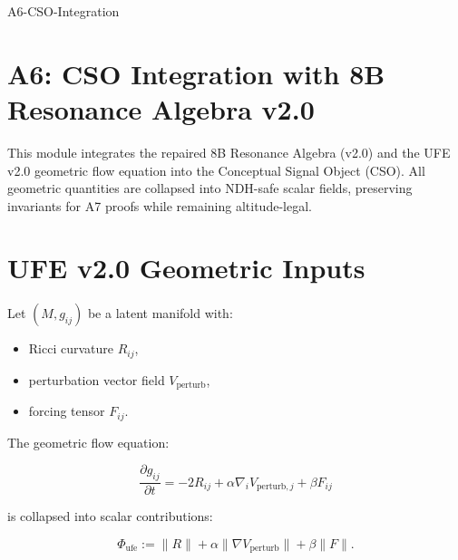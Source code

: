 \documentclass[11pt]{article}
\begin{document}


\begin{citationmembrane}{A6-CSO-Integration}
\end{citationmembrane}

\section*{A6: CSO Integration with 8B Resonance Algebra v2.0}

This module integrates the repaired 8B Resonance Algebra (v2.0) and the UFE v2.0
geometric flow equation into the Conceptual Signal Object (CSO). All geometric
quantities are collapsed into NDH-safe scalar fields, preserving invariants for
A7 proofs while remaining altitude-legal.

\newpage


\section{UFE v2.0 Geometric Inputs}

Let $(M, g_{ij})$ be a latent manifold with:

\begin{itemize}
  \item Ricci curvature $R_{ij}$,
  \item perturbation vector field $V_{\mathrm{perturb}}$,
  \item forcing tensor $F_{ij}$.
\end{itemize}

The geometric flow equation:

\[
\frac{\partial g_{ij}}{\partial t}
= -2 R_{ij}
+ \alpha \nabla_i V_{\mathrm{perturb},j}
+ \beta F_{ij}
\]

is collapsed into scalar contributions:

\[
\Phi_{\mathrm{ufe}} := \| R \| + \alpha \| \nabla V_{\mathrm{perturb}} \|
+ \beta \| F \|.
\]
\end{document}
